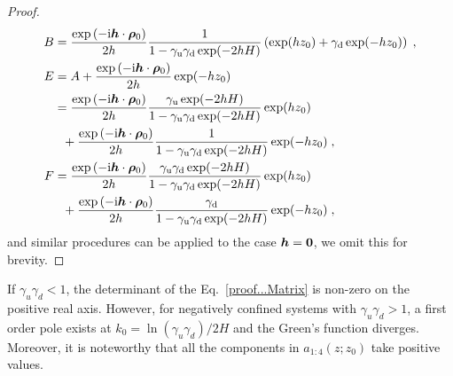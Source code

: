 \begin{proof}
\begin{align*}
B&=\frac{ \exp{(-\mathrm{i} \boldsymbol{h} \cdot \boldsymbol{\rho}_0)} }{2h }\frac{1}{1-\gamma_{\mathrm{u}}\gamma_{\mathrm{d}}\exp(-2hH)} \left(\exp(hz_0)+\gamma_{\mathrm{d}}\exp(-hz_0)\right)\;,\\
E&=A+\frac{\exp{(-\mathrm{i} \boldsymbol{h} \cdot \boldsymbol{\rho}_0)} }{2h }\exp(-hz_0)\\
&=\frac{\exp{(-\mathrm{i} \boldsymbol{h} \cdot \boldsymbol{\rho}_0)}}{2h }\frac{\gamma_{\mathrm{u}}\exp(-2hH)}{1-\gamma_{\mathrm{u}}\gamma_{\mathrm{d}}\exp(-2hH)} \exp(hz_0)\\&~~+\frac{\exp{(-\mathrm{i} \boldsymbol{h} \cdot \boldsymbol{\rho}_0)}}{2h }\frac{1}{1-\gamma_{\mathrm{u}}\gamma_{\mathrm{d}}\exp(-2hH)}\exp(-hz_0)\;,\\
F&=\frac{\exp{(-\mathrm{i} \boldsymbol{h} \cdot \boldsymbol{\rho}_0)}}{2h }\frac{\gamma_{\mathrm{u}}\gamma_{\mathrm{d}}\exp(-2hH)}{1-\gamma_{\mathrm{u}}\gamma_{\mathrm{d}}\exp(-2hH)} \exp(hz_0)\\&~~+\frac{\exp{(-\mathrm{i} \boldsymbol{h} \cdot \boldsymbol{\rho}_0)}}{2h }\frac{\gamma_{\mathrm{d}}}{1-\gamma_{\mathrm{u}}\gamma_{\mathrm{d}}\exp(-2hH)} \exp(-hz_0)\;,
\end{align*}
 and similar procedures can be applied to the case $\boldsymbol{h}=\bm{0}$, we omit this for brevity.
\end{proof}

\begin{rmk}\label{Remark...Nonzero+larger}
    If $\gamma_u \gamma_d < 1$, the determinant of the Eq.~\eqref{proof...Matrix} is non-zero on the positive real axis.
    However, for negatively confined systems with $\gamma_u \gamma_d > 1$, a first order pole exists at $k_0 = \ln(\gamma_u \gamma_d)/2H$ and the Green's function diverges.
    Moreover, it is noteworthy that all the components in $a_{1:4}(z;z_0)$ take positive values. 
\end{rmk}


